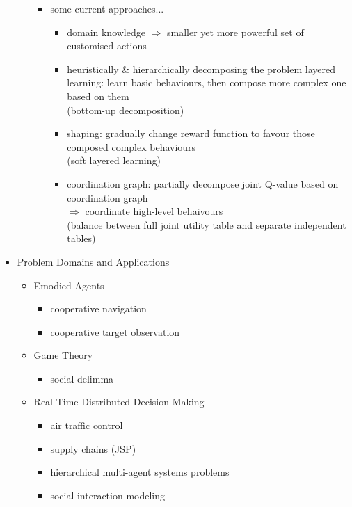 \begin{itemize}
\begin{itemize}
\begin{itemize}
		\item some current approaches...
			\begin{itemize}
			\item domain knowledge $\Rightarrow$ smaller yet more powerful set of customised actions
			\item heuristically \& hierarchically decomposing the problem
			layered learning: learn basic behaviours, then compose more complex one based on them \\
			(bottom-up decomposition)
			\item shaping: gradually change reward function to favour those composed complex behaviours \\
			(soft layered learning)
			\item coordination graph: partially decompose joint Q-value based on coordination graph \\
			$\Rightarrow$ coordinate high-level behaivours \\
			(balance between full joint utility table and separate independent tables) 
			\end{itemize}
		\end{itemize}
	\end{itemize}
\item Problem Domains and Applications
	\begin{itemize}
	\item Emodied Agents
		\begin{itemize}
		\item cooperative navigation
		\item cooperative target observation
		\end{itemize}
	\item Game Theory
		\begin{itemize}
		\item social delimma
		\end{itemize}
	\item Real-Time Distributed Decision Making
		\begin{itemize}
		\item air traffic control
		\item supply chains (JSP)
		\item hierarchical multi-agent systems problems
		\item social interaction modeling
		\end{itemize}
	\end{itemize}
\end{itemize}




















